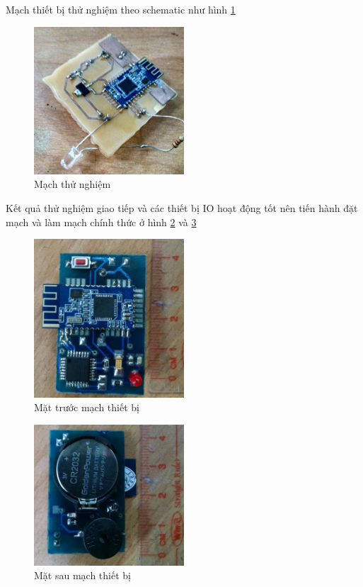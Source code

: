 Mạch thiết bị thử nghiệm theo schematic như hình \ref{fig: keydraft}

	\begin{figure}[H]
		\centering    
		\includegraphics[width=0.5\textwidth]{keydraft}
		\caption[Mạch thử nghiệm]{Mạch thử nghiệm}
		\label{fig: keydraft}
	\end{figure}

Kết quả thử nghiệm giao tiếp và các thiết bị IO hoạt động tốt nên tiến hành đặt mạch và làm mạch chính thức ở hình \ref{fig: key1} và \ref{fig: key2}

	\begin{figure}[H]
		\centering    
		\includegraphics[width=0.5\textwidth]{key1}
		\caption[Mặt trước mạch thiết bị]{Mặt trước mạch thiết bị}
		\label{fig: key1}
	\end{figure}	
	
	\begin{figure}[H]
		\centering    
		\includegraphics[width=0.5\textwidth]{key2}
		\caption[Mặt sau mạch thiết bị]{Mặt sau mạch thiết bị}
		\label{fig: key2}
	\end{figure}	
	
